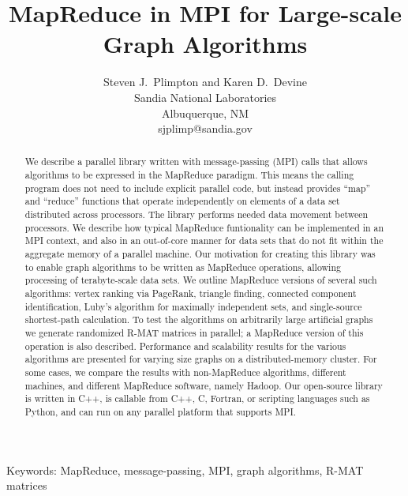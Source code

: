 \documentclass[11pt]{article}
\begin{document}
\title{Map{R}educe in {MPI} for Large-scale Graph Algorithms}

\author{
Steven J.~Plimpton and Karen D.~Devine \\
Sandia National Laboratories \\
Albuquerque, NM \\
sjplimp@sandia.gov
}

\date{}

\maketitle

\centerline{Keywords: MapReduce, message-passing, MPI, graph
algorithms, R-MAT matrices}

\vspace*{0.4in}

\begin{abstract}

We describe a parallel library written with message-passing (MPI)
calls that allows algorithms to be expressed in the MapReduce
paradigm.  This means the calling program does not need to include
explicit parallel code, but instead provides ``map'' and ``reduce''
functions that operate independently on elements of a data set
distributed across processors.  The library performs needed data
movement between processors.  We describe how typical MapReduce
funtionality can be implemented in an MPI context, and also in an
out-of-core manner for data sets that do not fit within the aggregate
memory of a parallel machine.  Our motivation for creating this
library was to enable graph algorithms to be written as MapReduce
operations, allowing processing of terabyte-scale data sets.  We
outline MapReduce versions of several such algorithms: vertex ranking
via PageRank, triangle finding, connected component identification,
Luby's algorithm for maximally independent sets, and single-source
shortest-path calculation.  To test the algorithms on arbitrarily
large artificial graphs we generate randomized R-MAT matrices in
parallel; a MapReduce version of this operation is also described.
Performance and scalability results for the various algorithms are
presented for varying size graphs on a distributed-memory cluster.
For some cases, we compare the results with non-MapReduce algorithms,
different machines, and different MapReduce software, namely Hadoop.
Our open-source library is written in C++, is callable from C++, C,
Fortran, or scripting languages such as Python, and can run on any
parallel platform that supports MPI.

\end{abstract}

\pagebreak











\end{document}
